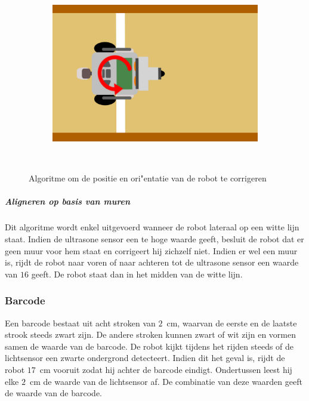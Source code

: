 \documentclass[eind]{penoverslag}
\begin{document}
\begin{figure}[h]
\begin{subfigure}[h]{0.24\textwidth}
		\caption{ }
		\label{fig:AlgoWit6}
	\end{subfigure}
	\begin{subfigure}[h]{0.24\textwidth}
		\includegraphics[width=\textwidth]{WitteLijn7}
		\caption{ }
		\label{fig:AlgoWit7}
	\end{subfigure}\\
	\caption{Algoritme om de positie en ori"entatie van de robot te corrigeren}
	\label{fig:AlgoWit}
\end{figure}

\subparagraph{Aligneren op basis van muren}
Dit algoritme wordt enkel uitgevoerd wanneer de robot lateraal op een witte lijn staat. Indien de ultrasone sensor een te hoge waarde geeft, besluit de robot dat er geen muur voor hem staat en corrigeert hij zichzelf niet. Indien er wel een muur is, rijdt de robot naar voren of naar achteren tot de ultrasone sensor een waarde van $16$ geeft. De robot staat dan in het midden van de witte lijn.

\subsubsection{Barcode}
\label{sssec:AlgoBar}
Een barcode bestaat uit acht stroken van $2$~cm, waarvan de eerste en de laatste strook steeds zwart zijn. De andere stroken kunnen zwart of wit zijn en vormen samen de waarde van de barcode. De robot kijkt tijdens het rijden steeds of de lichtsensor een zwarte ondergrond detecteert. Indien dit het geval is, rijdt de robot $17$~cm vooruit zodat hij achter de barcode eindigt. Ondertussen leest hij elke $2$~cm de waarde van de lichtsensor af. De combinatie van deze waarden geeft de waarde van de barcode.\\
\end{document}

